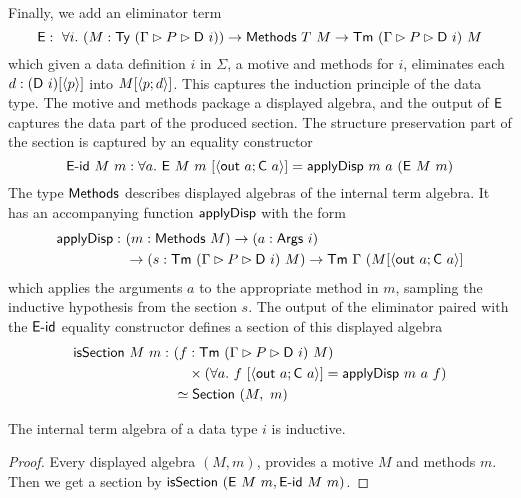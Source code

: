 Finally, we add an eliminator term
\[
	\textsf{E} :\ \forall i.\ (M : \textsf{Ty}\ (\Gamma \rhd P \rhd \textsf{D}\ i)) \to \textsf{Methods}\ T\ M \to \textsf{Tm}\ (\Gamma \rhd P \rhd \textsf{D}\ i)\ M \\
\]
which given a data definition $i$ in $\Sigma$, a motive and methods for $i$,
eliminates each $d : (\textsf{D}\ i)[\langle p\rangle]$ into $M[\langle p;d\rangle]$. This captures the induction
principle of the data type. The motive and methods package a displayed algebra,
and the output of $\textsf{E}$ captures the data part of the produced section. The
structure preservation part of the section is captured by an equality
constructor
\[
	\mta{E-id}\ M\ m : \forall a.\ \mta{E}\ M\ m\ [\Msub{\mta{out}\ a; \mta{C}\ a}] = \mta{applyDisp}\ m\ a\ (\mta{E}\ M\ m)
\]
The type $\textsf{Methods}$ describes displayed algebras of the internal term algebra.
It has an accompanying function $\textsf{applyDisp}$ with the form
\begin{align*}
    \mta{applyDisp} :\ &(m : \mta{Methods}\ M) \to (a : \mta{Args}\ i) \\
    &\to (s : \Tm\ (\Gamma \rhd P \rhd \mta{D}\ i)\ M) \to \Tm\ \Gamma\ (M[\Msub{\mta{out}\ a; \mta{C}\ a}]
\end{align*}
which applies the arguments $a$ to the appropriate method in $m$, sampling the inductive hypothesis
from the section $s$.
The output of the eliminator paired with the $\textsf{E-id}$ equality
constructor defines a section of this displayed algebra
\begin{align*}
    \textsf{isSection}\ M\ m :\ & (f : \textsf{Tm}\ (\Gamma \rhd P \rhd \textsf{D}\ i)\ M) \\
    &\quad\times (\forall a.\ f\ [\langle\textsf{out}\ a;\textsf{C}\ a\rangle] = \textsf{applyDisp}\ m\ a\ f) \\
    &\simeq \textsf{Section}\ (M,\ m)
\end{align*}

\begin{lemma}
	The internal term algebra of a data type $i$ is inductive.
	\begin{proof}
		Every displayed algebra $(M, m)$, provides a motive $M$ and methods $m$. Then we get a section by $\mta{isSection}\ (\mta{E}\ M\ m, \mta{E-id}\ M\ m)$.
	\end{proof}
\end{lemma}


